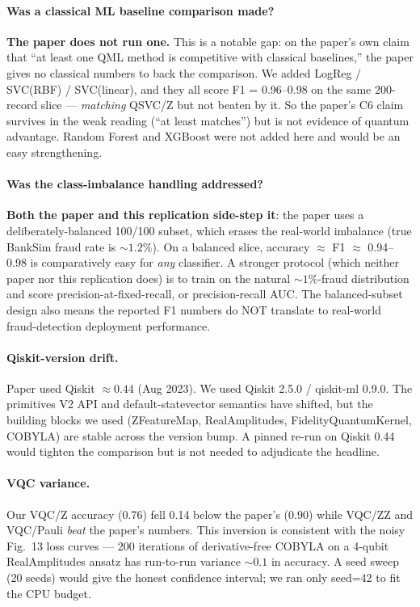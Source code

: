 \documentclass[11pt]{article}
\begin{document}
\paragraph{Was a classical ML baseline comparison made?}
\textbf{The paper does not run one.} This is a notable gap: on the paper's own claim
that ``at least one QML method is competitive with classical baselines,'' the paper
gives no classical numbers to back the comparison. We added
LogReg / SVC(RBF) / SVC(linear), and they all score F1 = 0.96--0.98 on the same 200-record
slice --- \emph{matching} QSVC/Z but not beaten by it. So the paper's C6 claim survives
in the weak reading (``at least matches'') but is not evidence of quantum advantage.
Random Forest and XGBoost were not added here and would be an easy strengthening.

\paragraph{Was the class-imbalance handling addressed?}
\textbf{Both the paper and this replication side-step it}: the paper uses a
deliberately-balanced 100/100 subset, which erases the real-world imbalance
(true BankSim fraud rate is $\sim 1.2\%$). On a balanced slice, accuracy $\approx$
F1 $\approx$ 0.94--0.98 is comparatively easy for \emph{any} classifier. A stronger
protocol (which neither paper nor this replication does) is to train on the natural
$\sim 1\%$-fraud distribution and score precision-at-fixed-recall, or precision-recall
AUC. The balanced-subset design also means the reported F1 numbers do NOT translate
to real-world fraud-detection deployment performance.

\paragraph{Qiskit-version drift.}
Paper used Qiskit $\approx 0.44$ (Aug 2023). We used Qiskit 2.5.0 / qiskit-ml 0.9.0.
The primitives V2 API and default-statevector semantics have shifted, but the
building blocks we used (ZFeatureMap, RealAmplitudes, FidelityQuantumKernel, COBYLA)
are stable across the version bump. A pinned re-run on Qiskit 0.44 would tighten the
comparison but is not needed to adjudicate the headline.

\paragraph{VQC variance.}
Our VQC/Z accuracy (0.76) fell 0.14 below the paper's (0.90) while VQC/ZZ and
VQC/Pauli \emph{beat} the paper's numbers. This inversion is consistent with the
noisy Fig.~13 loss curves --- 200 iterations of derivative-free COBYLA on a 4-qubit
RealAmplitudes ansatz has run-to-run variance $\sim 0.1$ in accuracy. A seed sweep
(20 seeds) would give the honest confidence interval; we ran only seed=42 to fit the
CPU budget.
\end{document}
